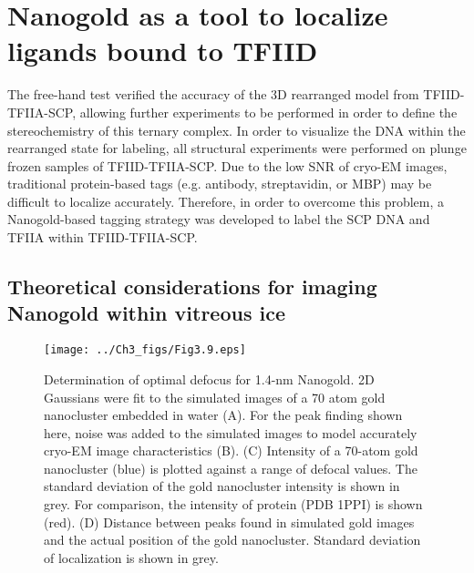\section{Nanogold as a tool to localize ligands bound to TFIID}

The free-hand test verified the accuracy of the 3D rearranged model from TFIID-TFIIA-SCP, allowing further experiments to be performed in order to define the stereochemistry of this ternary complex. In order to visualize the DNA within the rearranged state for labeling, all structural experiments were performed on plunge frozen samples of TFIID-TFIIA-SCP. Due to the low SNR of cryo-EM images, traditional protein-based tags (e.g. antibody, streptavidin, or MBP) may be difficult to localize accurately. Therefore, in order to overcome this problem, a Nanogold-based tagging strategy was developed to label the SCP DNA and TFIIA within TFIID-TFIIA-SCP.
 
\subsection{Theoretical considerations for imaging Nanogold within vitreous ice}

\begin{figure}
\centering
\texttt{[image: ../Ch3\_figs/Fig3.9.eps]}
\caption[Determination of optimal defocus for 1.4-nm Nanogold]{Determination of optimal defocus for 1.4-nm Nanogold. 2D Gaussians were fit to the simulated images of a 70 atom gold nanocluster embedded in water (A). For the peak finding shown here, noise was added to the simulated images to model accurately cryo-EM image characteristics (B). (C) Intensity of a 70-atom gold nanocluster (blue) is plotted against a range of defocal values. The standard deviation of the gold nanocluster intensity is shown in grey. For comparison, the intensity of protein (PDB 1PPI) is shown (red). (D) Distance between peaks found in simulated gold images and the actual position of the gold nanocluster. Standard deviation of localization is shown in grey.}
\label{fig:Gold}
\end{figure} 

